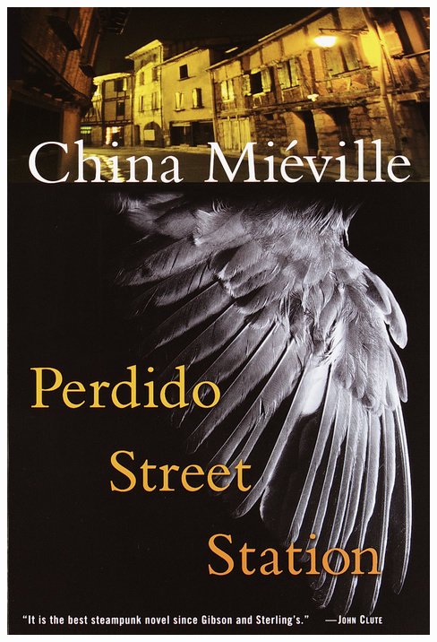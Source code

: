 \documentclass{tufte-handout}
\makeatletter
\newcommand{\varcaption}[2][0pt]{%
  \gsetlength{\@tufte@caption@vertical@offset}{-#1}%
  \gdef\@tufte@stored@varcaption{#2}%
}
\gdef\@tufte@stored@varcaption{} %
\makeatother
\begin{document}
\begin{marginfigure}[-44\baselineskip]
   \includegraphics[width=\linewidth]{images/perdido_street_station.jpg}
   \varcaption{\href{https://www.hmhbooks.com/shop/books/Ubik/9780547572291}{Publisher Link}, \href{https://www.amazon.com/Ubik-Philip-K-Dick/dp/0547572298}{Amazon Link}}
\end{marginfigure}
\end{document}
